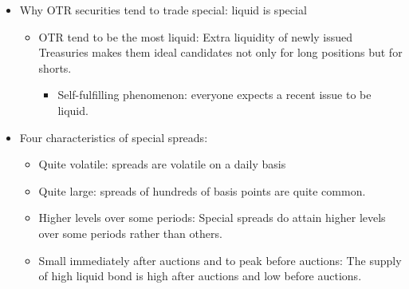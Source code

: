\begin{itemize}
\item Why OTR securities tend to trade special: liquid is special
    \begin{itemize}
    \item OTR tend to be the most liquid: Extra liquidity of newly issued Treasuries makes them ideal candidates not only for long positions but for shorts.
        \begin{itemize}
        \item Self-fulfilling phenomenon: everyone expects a recent issue to be liquid.
        \end{itemize}
    \end{itemize}
\item Four characteristics of special spreads:
    \begin{itemize}
    \item Quite volatile: spreads are volatile on a daily basis
    \item Quite large: spreads of hundreds of basis points are quite common.
    \item Higher levels over some periods: Special spreads do attain higher levels over some periods rather than others.
    \item Small immediately after auctions and to peak before auctions: The supply of high liquid bond is high after auctions and low before auctions.
    \end{itemize}
\end{itemize}




